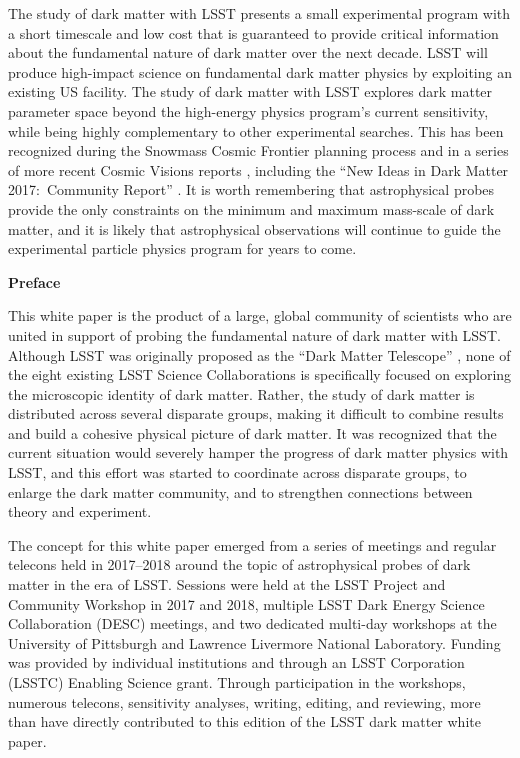 The study of dark matter with LSST presents a small experimental program with a short timescale and low cost that is guaranteed to provide critical information about the fundamental nature of dark matter over the next decade.
LSST will produce high-impact science on fundamental dark matter physics by exploiting an existing US facility. 
The study of dark matter with LSST explores dark matter parameter space beyond the high-energy physics program's current sensitivity, while being highly complementary to other experimental searches. %
This has been recognized during the Snowmass Cosmic Frontier planning process \citep[\eg,][]{1305.1605, 1310.8642, 1310.5662} and in a series of more recent Cosmic Visions reports \citep[\eg,][]{1604.07626,1802.07216}, including the ``New Ideas in Dark Matter 2017:\ Community Report'' \citep{1707.04591}.
It is worth remembering that astrophysical probes provide the only constraints on the minimum and maximum mass-scale of dark matter, and it is likely that astrophysical observations will continue to guide the  experimental particle physics program for years to come.

\clearpage

\begin{center}
  {\Large \bf Preface}
\end{center}

This white paper is the product of a large, global community of scientists who are united in support of probing the fundamental nature of dark matter with LSST.
Although LSST was originally proposed as the ``Dark Matter Telescope'' \citep{Tyson:2001}, none of the eight existing LSST Science Collaborations is specifically focused on exploring the microscopic identity of dark matter.
Rather, the study of dark matter is distributed across several disparate groups, making it difficult to combine results and build a cohesive physical picture of dark matter.
It was recognized that the current situation would severely hamper the progress of dark matter physics with LSST, and this effort was started to coordinate across disparate groups, to enlarge the dark matter community, and to strengthen connections between theory and experiment.

The concept for this white paper emerged from a series of meetings and regular telecons held in 2017--2018 around the topic of astrophysical probes of dark matter in the era of LSST.
Sessions were held at the LSST Project and Community Workshop in 2017 and 2018, multiple LSST Dark Energy Science Collaboration (DESC) meetings, and two dedicated multi-day workshops at the University of Pittsburgh and Lawrence Livermore National Laboratory.
Funding was provided by individual institutions and through an LSST Corporation (LSSTC) Enabling Science grant.
Through participation in the workshops, numerous telecons, sensitivity analyses, writing, editing, and reviewing, more than  have directly contributed to this edition of the LSST dark matter white paper.

